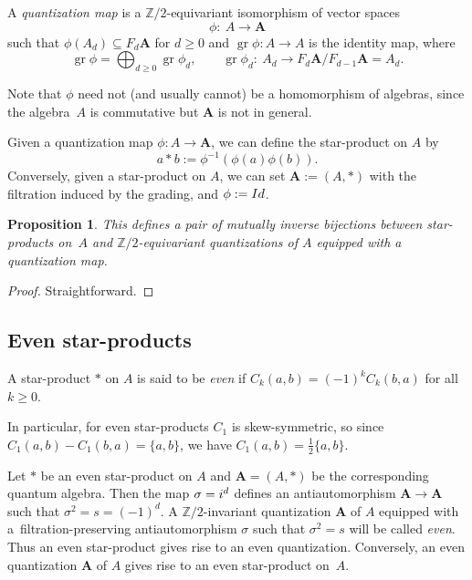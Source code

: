 \documentclass[11pt]{article}
\numberwithin{equation}{section}
\numberwithin{equation}{section}
\newtheorem{Proposition}[Theorem]{Proposition}
\begin{document}
\begin{Definition}A \emph{quantization map} is a ${\mathbb Z}/2$-equivariant isomorphism of vector spaces
\[
\phi \colon \ A \to {{\mathbf A}}
\]
such that $\phi(A_d) \subseteq F_d{{\mathbf A}}$ for $d\ge 0$ and $\operatorname{gr} \phi \colon A \to A$ is the identity map, where
\[
\operatorname{gr} \phi = \bigoplus_{d\geq 0} \operatorname{gr} \phi_d, \qquad \operatorname{gr} \phi_d \colon \ A_d \to F_d{{\mathbf A}}/F_{d-1}{{\mathbf A}}=A_d.
\]
\end{Definition}
Note that $\phi$ need not (and usually cannot) be a homomorphism of algebras, since the algebra~$A$ is commutative but ${{\mathbf A}}$ is not in general.

Given a quantization map $\phi\colon A \to {{\mathbf A}}$, we can define the star-product on $A$ by
\[
a * b := \phi^{-1}(\phi(a)\phi(b)).
\]
Conversely, given a star-product on $A$, we can set ${{\mathbf A}}:=(A,*)$ with the filtration induced by the grading, and $\phi:={\rm Id}$.

\begin{Proposition} This defines a pair of mutually inverse bijections between star-products on~$A$ and ${\mathbb Z}/2$-equivariant quantizations of $A$ equipped with a quantization map.
\end{Proposition}

\begin{proof} Straightforward.
\end{proof}

\subsection{Even star-products}

\begin{Definition} A star-product $*$ on $A$ is said to be {\it even} if $C_k(a,b)=(-1)^k C_k(b,a)$ for all $k\ge 0$.
\end{Definition}

In particular, for even star-products $C_1$ is skew-symmetric, so since $C_1(a,b)-C_1(b,a)=\lbrace a,b\rbrace$, we have $C_1(a,b)=\frac{1}{2}\lbrace a,b\rbrace$.

Let $*$ be an even star-product on $A$ and ${{\mathbf A}}=(A,*)$ be the corresponding quantum algebra.
Then the map $\sigma={\rm i}^d$ defines an antiautomorphism ${{\mathbf A}}\to {{\mathbf A}}$ such that $\sigma^2=s=(-1)^d$. A ${\mathbb Z}/2$-invariant quantization ${\mathbf A}$ of $A$ equipped with a~filtration-preserving antiautomorphism $\sigma$ such that $\sigma^2=s$ will be called {\it even}. Thus an even star-product gives rise to an even quantization. Conversely, an even quantization ${{\mathbf A}}$ of $A$ gives rise to an even star-product on~$A$.
\end{document}
